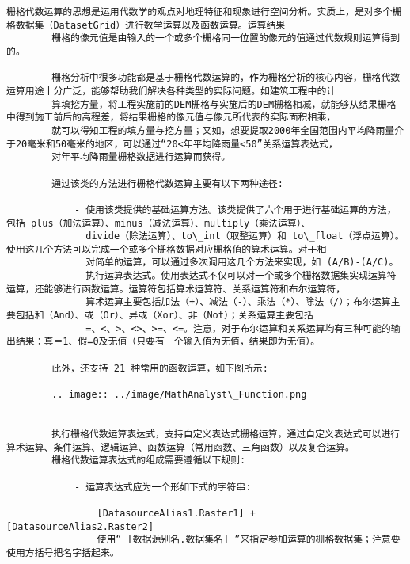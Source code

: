 \documentclass[11pt]{article}
\begin{document}
\begin{Verbatim}[commandchars=\\\{\}]
        栅格代数运算的思想是运用代数学的观点对地理特征和现象进行空间分析。实质上，是对多个栅格数据集（DatasetGrid）进行数学运算以及函数运算。运算结果
        栅格的像元值是由输入的一个或多个栅格同一位置的像元的值通过代数规则运算得到的。
        
        栅格分析中很多功能都是基于栅格代数运算的，作为栅格分析的核心内容，栅格代数运算用途十分广泛，能够帮助我们解决各种类型的实际问题。如建筑工程中的计
        算填挖方量，将工程实施前的DEM栅格与实施后的DEM栅格相减，就能够从结果栅格中得到施工前后的高程差，将结果栅格的像元值与像元所代表的实际面积相乘，
        就可以得知工程的填方量与挖方量；又如，想要提取2000年全国范围内平均降雨量介于20毫米和50毫米的地区，可以通过“20<年平均降雨量<50”关系运算表达式，
        对年平均降雨量栅格数据进行运算而获得。
        
        通过该类的方法进行栅格代数运算主要有以下两种途径:
        
            - 使用该类提供的基础运算方法。该类提供了六个用于进行基础运算的方法，包括 plus（加法运算）、minus（减法运算）、multiply（乘法运算）、
              divide（除法运算）、to\_int（取整运算）和 to\_float（浮点运算）。使用这几个方法可以完成一个或多个栅格数据对应栅格值的算术运算。对于相
              对简单的运算，可以通过多次调用这几个方法来实现，如 (A/B)-(A/C)。
            - 执行运算表达式。使用表达式不仅可以对一个或多个栅格数据集实现运算符运算，还能够进行函数运算。运算符包括算术运算符、关系运算符和布尔运算符，
              算术运算主要包括加法（+）、减法（-）、乘法（*）、除法（/）；布尔运算主要包括和（And）、或（Or）、异或（Xor）、非（Not）；关系运算主要包括
              =、<、>、<>、>=、<=。注意，对于布尔运算和关系运算均有三种可能的输出结果：真＝1、假=0及无值（只要有一个输入值为无值，结果即为无值）。
        
        此外，还支持 21 种常用的函数运算，如下图所示:
        
        .. image:: ../image/MathAnalyst\_Function.png
        
        
        执行栅格代数运算表达式，支持自定义表达式栅格运算，通过自定义表达式可以进行算术运算、条件运算、逻辑运算、函数运算（常用函数、三角函数）以及复合运算。
        栅格代数运算表达式的组成需要遵循以下规则:
        
            - 运算表达式应为一个形如下式的字符串:
        
                [DatasourceAlias1.Raster1] + [DatasourceAlias2.Raster2]
                使用“ [数据源别名.数据集名] ”来指定参加运算的栅格数据集；注意要使用方括号把名字括起来。
        

\end{Verbatim}
\end{document}
